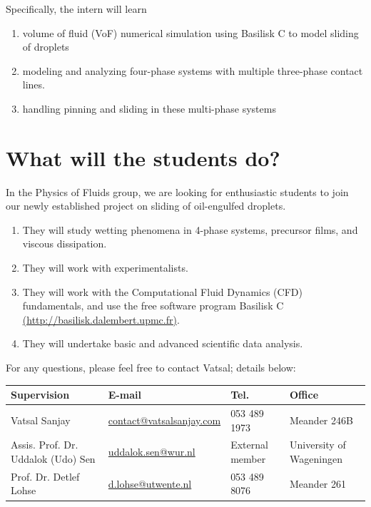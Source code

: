 \documentclass[a4paper,10pt]{article}
\begin{document}
\noindent Specifically, the intern will learn

\begin{enumerate}
	\item volume of fluid (VoF) numerical simulation using Basilisk C to model sliding of droplets
	\item modeling and analyzing four-phase systems with multiple three-phase contact lines. 
	\item handling pinning and sliding in these multi-phase systems
\end{enumerate}


\section*{What will the students do?}
In the Physics of Fluids group, we are looking for enthusiastic students to join our newly established project on sliding of oil-engulfed droplets.
\begin{enumerate}
	\item They will study wetting phenomena in 4-phase systems, precursor films, and viscous dissipation. 
	\item They will work with experimentalists. 
	\item They will work with the Computational Fluid Dynamics (CFD) fundamentals, and use the free software program Basilisk C \href{http://basilisk.dalembert.upmc.fr}{(http://basilisk.dalembert.upmc.fr)}.
	\item They will undertake basic and advanced scientific data analysis.
\end{enumerate}


For any questions, please feel free to contact Vatsal; details below: 

\begin{center}
	\begin{tabular}{|l|l|l|l|}
		\hline \textbf{Supervision} & \textbf{E-mail} & \textbf{Tel.} & \textbf{Office} \\ 
		\hline Vatsal Sanjay & \href{mailto:contact@vatsalsanjay.com}{contact@vatsalsanjay.com} & 053 489 1973 & Meander 246B \\ 
		\hline Assis. Prof. Dr. Uddalok (Udo) Sen & \href{mailto:uddalok.sen@wur.nl }{uddalok.sen@wur.nl} & External member & University of Wageningen \\ 
		\hline Prof. Dr. Detlef Lohse & \href{mailto:d.lohse@utwente.nl}{d.lohse@utwente.nl} & 053 489 8076 & Meander 261 \\ 
		\hline 
	\end{tabular} 
\end{center}



\end{document}
